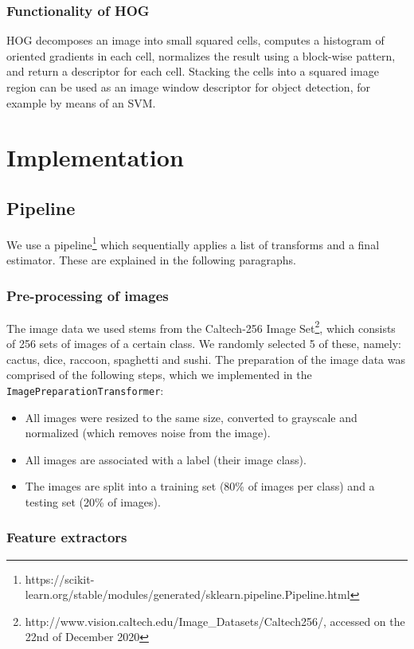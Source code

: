 \documentclass{scrartcl}
\begin{document}
\subsubsection{Functionality of HOG}

HOG decomposes an image into small squared cells, computes a histogram of oriented gradients in each cell, normalizes the result using a block-wise pattern, and return a descriptor for each cell. Stacking the cells into a squared image region can be used as an image window descriptor for object detection, for example by means of an SVM.

\section{Implementation}

\subsection{Pipeline}
We use a pipeline\footnote{https://scikit-learn.org/stable/modules/generated/sklearn.pipeline.Pipeline.html} which sequentially applies a list of transforms and a final estimator. These are explained in the following paragraphs.

\subsubsection{Pre-processing of images}
The image data we used stems from the Caltech-256 Image Set\footnote{http://www.vision.caltech.edu/Image\_Datasets/Caltech256/, accessed on the 22nd of December 2020}, which consists of 256 sets of images of a certain class. We randomly selected 5 of these, namely: cactus, dice, raccoon, spaghetti and sushi. The preparation of the image data was comprised of the following steps, which we implemented in the \texttt{ImagePreparationTransformer}:
\begin{itemize}
  \item All images were resized to the same size, converted to grayscale and normalized (which removes noise from the image).
  \item All images are associated with a label (their image class).
  \item The images are split into a training set (80\% of images per class) and a testing set (20\% of images).
\end{itemize}

\subsubsection{Feature extractors}
\end{document}
